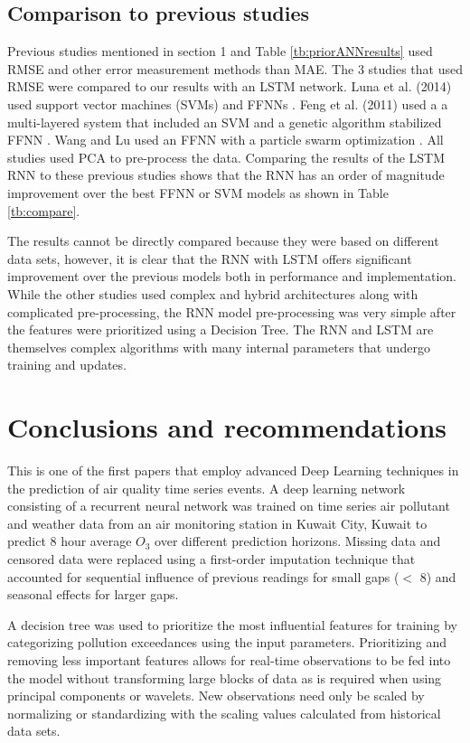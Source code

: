 \documentclass[preprint,12pt,authoryear]{elsarticle}
\begin{document}
\begin{linenumbers}
\subsection{Comparison to previous studies}
Previous studies mentioned in section 1 and Table \ref{tb:priorANNresults} used RMSE and other error measurement methods than MAE. The 3 studies that used RMSE were compared to our results with an LSTM network. Luna et al. (2014) used support vector machines (SVMs) and FFNNs \citep{Luna2014}. Feng et al. (2011) used a a multi-layered system that included an SVM and a genetic algorithm stabilized FFNN \citep{Feng2011}. Wang and Lu used an FFNN with a particle swarm optimization \citep{Wang2006}. All studies used PCA to pre-process the data. Comparing the results of the LSTM RNN to these previous studies shows that the RNN has an order of magnitude improvement over the best FFNN or SVM models as shown in Table \ref{tb:compare}.
%

%
The results cannot be directly compared because they were based on different data sets, however, it is clear that the RNN with LSTM offers significant improvement over the previous models both in performance and implementation. While the other studies used complex and hybrid architectures along with complicated pre-processing, the RNN model pre-processing was very simple after the features were prioritized using a Decision Tree. The RNN and LSTM are themselves complex algorithms with many internal parameters that undergo training and updates.
 
\section{Conclusions and recommendations}
This is one of the first papers that employ advanced Deep Learning techniques in the prediction of air quality time series events. A deep learning network consisting of a recurrent neural network was trained on time series air pollutant and weather data from an air monitoring station in Kuwait City, Kuwait to predict 8 hour average $O_{3}$ over different prediction horizons. Missing data and censored data were replaced using a first-order imputation technique that accounted for sequential influence of previous readings for small gaps ($<$ 8) and seasonal effects for larger gaps. 

A decision tree was used to prioritize the most influential features for training by categorizing pollution exceedances using the input parameters. Prioritizing and removing less important features allows for real-time observations to be fed into the model without transforming large blocks of data as is required when using principal components or wavelets. New observations need only be scaled by normalizing or standardizing with the scaling values calculated from historical data sets. 


\end{linenumbers}
\end{document}
